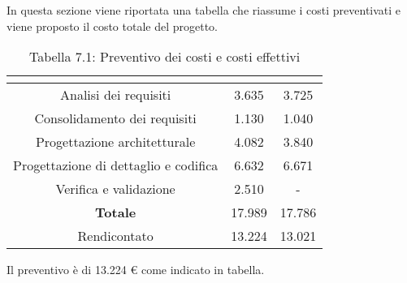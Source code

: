 In questa sezione viene riportata una tabella che riassume i costi preventivati e viene proposto il costo totale del progetto.
\\
\renewcommand{\arraystretch}{1.5}
\begin{table}[H]
\begin{center}
\begin{tabular}{|c|c|c|}
\hline
\rowcolor{title_row}
\textbf{\color{title_text}{Periodo}}  & \textbf{\color{title_text}{Preventivo \euro}} & \textbf{\color{title_text}{Consuntivo \euro}} \\ \hline
Analisi dei requisiti   & 3.635 & 3.725 \\ \hline
Consolidamento dei requisiti   & 1.130 & 1.040 \\ \hline
Progettazione architetturale    & 4.082 & 3.840 \\ \hline
Progettazione di dettaglio e codifica    & 6.632 & 6.671 \\ \hline
Verifica e validazione    & 2.510 & - \\ \hline
\textbf{Totale}   & 17.989 & 17.786 \\ \hline
Rendicontato   & 13.224 & 13.021 \\ \hline
\end{tabular}
\caption{Tabella 7.1: Preventivo dei costi e costi effettivi\label{}}
\end{center}
\end{table}
\renewcommand{\arraystretch}{1}

Il preventivo è di 13.224 \euro{} come indicato in tabella.
\newpage
